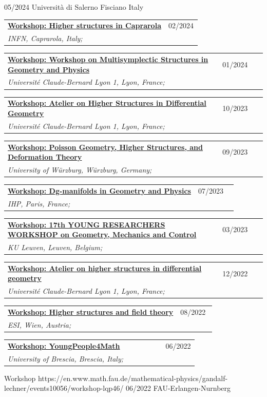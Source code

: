\documentclass[a4paper]{article}
\newcommand{\longvoice}[8]{
    \begin{tabular}{p{0.83\linewidth} p{0.17\linewidth} }
        \textbf{\href{#3}{#2: #1}} & #4 
        \\ 
        \textit{#5, #6, #7;} & {\small\emph{#8}}
    \end{tabular}
    \vspace{.5em}
}
\begin{document}
        {05/2024}
        {Università di Salerno}
        {Fisciano}
        {Italy}
        {}
    \longvoice{Higher structures in Caprarola}
        {Workshop}
        {http://wpage.unina.it/francesco.dandrea/Caprarola2024/index.html}
        {02/2024}
        {INFN}
        {Caprarola}
        {Italy}
        {}
    \longvoice{Workshop on Multisymplectic Structures in Geometry and Physics}
        {Workshop}
        {https://math.gmu.edu/~cblacke/lyon.html}
        {01/2024}
        {Université Claude-Bernard Lyon 1}
        {Lyon}
        {France}
        {}
    \longvoice{Atelier on Higher Structures in Differential Geometry}
        {Workshop}
        {https://ryvkin.eu/hs2023/index.html}
        {10/2023}
        {Université Claude-Bernard Lyon 1}
        {Lyon}
        {France}
        {}
    \longvoice{Poisson Geometry, Higher Structures, and Deformation Theory}
        {Workshop}
        {https://www.mathematik.uni-wuerzburg.de/mathematicalphysics/forschung/veranstaltungen/workshops-und-konferenzen/single/news/poisson-geometry-higher-structures-and-deformation-theory/}
        {09/2023}
        {University of Würzburg}
        {Würzburg}
        {Germany}
        {}
    \longvoice{Dg-manifolds in Geometry and Physics}
        {Workshop}
        {https://indico.math.cnrs.fr/event/7885/}
        {07/2023}
        {IHP}
        {Paris}
        {France}
        {}
    \longvoice{17th YOUNG RESEARCHERS WORKSHOP on Geometry, Mechanics and Control}
        {Workshop}
        {https://wis.kuleuven.be/events/young-researchers-workshop2023/young-researchers-workshop2023}
        {03/2023}
        {KU Leuven}
        {Leuven}
        {Belgium}
        {}
    \longvoice{Atelier on higher structures in differential geometry}
        {Workshop}
        {https://ryvkin.eu/atelier2022/}
        {12/2022}
        {Université Claude-Bernard Lyon 1}
        {Lyon}
        {France}
        {}
    \longvoice{Higher structures and field theory}
        {Workshop}
        {https://www.esi.ac.at/events/e430/}
        {08/2022}
        {ESI}
        {Wien}
        {Austria}
        {}
    \longvoice{YoungPeople4Math}
        {Workshop}
        {https://www.dropbox.com/s/2elzcczx7m0o9zf/2206-Brescia-YoungPeople4Math.pdf?dl=0}
        {06/2022}
        {University of Brescia}
        {Brescia}
        {Italy}
        {}
        {Workshop}
        {https://en.www.math.fau.de/mathematical-physics/gandalf-lechner/events10056/workshop-lqp46/}
        {06/2022}
        {FAU-Erlangen-Nurnberg}
\end{document}
